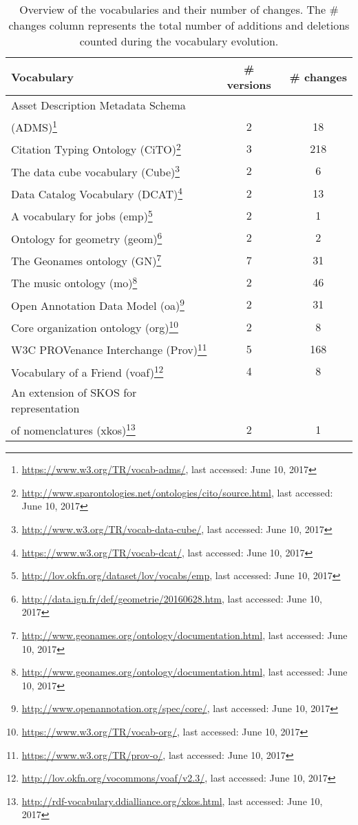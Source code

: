 \begin{table} [H]
	\centering
	\caption{Overview of the vocabularies and their number of changes. The \# changes column represents the total number of additions and deletions counted during the vocabulary evolution.}
	\label{table:vocabs}
	\begin{tabular}{lcc}
		\toprule
		Vocabulary & \# versions & \#  changes\\
		\midrule
		Asset Description Metadata Schema \\ (ADMS)\footnote{\url{https://www.w3.org/TR/vocab-adms/}, last accessed: June 10, 2017} & 2 &18\\
		Citation Typing Ontology (CiTO)\footnote{\url{http://www.sparontologies.net/ontologies/cito/source.html}, last accessed: June 10, 2017} & 3 &218\\
		The data cube vocabulary (Cube)\footnote{\url{http://www.w3.org/TR/vocab-data-cube/}, last accessed: June 10, 2017} & 2&6 \\
		Data Catalog Vocabulary (DCAT)\footnote{\url{https://www.w3.org/TR/vocab-dcat/}, last accessed: June 10, 2017} & 2 &13\\
		A vocabulary for jobs (emp)\footnote{\url{http://lov.okfn.org/dataset/lov/vocabs/emp}, last accessed: June 10, 2017} & 2 &1\\
		Ontology for geometry (geom)\footnote{\url{http://data.ign.fr/def/geometrie/20160628.htm}, last accessed: June 10, 2017} & 2& 2\\
		The Geonames ontology (GN)\footnote{\url{http://www.geonames.org/ontology/documentation.html}, last accessed: June 10, 2017} & 7 &31\\
		The music ontology (mo)\footnote{\url{http://www.geonames.org/ontology/documentation.html}, last accessed: June 10, 2017} & 2 &46\\
		Open Annotation Data Model (oa)\footnote{\url{http://www.openannotation.org/spec/core/}, last accessed: June 10, 2017} & 2 &31\\
		Core organization ontology (org)\footnote{\url{https://www.w3.org/TR/vocab-org/}, last accessed: June 10, 2017} & 2& 8\\
		W3C PROVenance Interchange (Prov)\footnote{\url{https://www.w3.org/TR/prov-o/}, last accessed: June 10, 2017} & 5 &168\\
		Vocabulary of a Friend (voaf)\footnote{\url{http://lov.okfn.org/vocommons/voaf/v2.3/}, last accessed: June 10, 2017} & 4 &8\\
		An extension of SKOS for representation \\ of nomenclatures (xkos)\footnote{\url{http://rdf-vocabulary.ddialliance.org/xkos.html}, last accessed: June 10, 2017} & 2&1\\
		\bottomrule
	\end{tabular}
\end{table}
 

